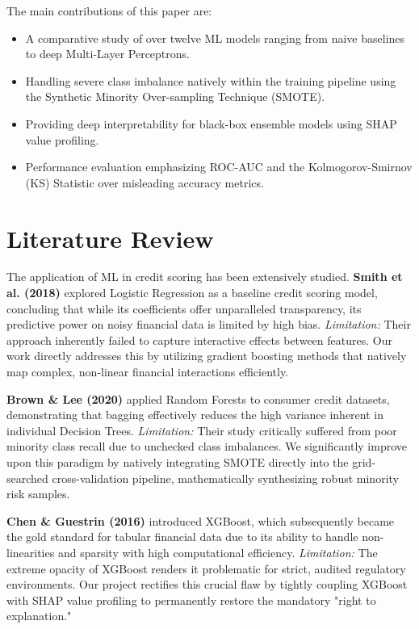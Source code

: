 \documentclass[12pt,a4paper]{article}
\begin{document}
The main contributions of this paper are:
\begin{itemize}
    \item A comparative study of over twelve ML models ranging from naive baselines to deep Multi-Layer Perceptrons.
    \item Handling severe class imbalance natively within the training pipeline using the Synthetic Minority Over-sampling Technique (SMOTE).
    \item Providing deep interpretability for black-box ensemble models using SHAP value profiling.
    \item Performance evaluation emphasizing ROC-AUC and the Kolmogorov-Smirnov (KS) Statistic over misleading accuracy metrics.
\end{itemize}

\section{Literature Review}
The application of ML in credit scoring has been extensively studied.
\textbf{Smith et al. (2018)} explored Logistic Regression as a baseline credit scoring model, concluding that while its coefficients offer unparalleled transparency, its predictive power on noisy financial data is limited by high bias. \textit{Limitation:} Their approach inherently failed to capture interactive effects between features. Our work directly addresses this by utilizing gradient boosting methods that natively map complex, non-linear financial interactions efficiently.

\textbf{Brown \& Lee (2020)} applied Random Forests to consumer credit datasets, demonstrating that bagging effectively reduces the high variance inherent in individual Decision Trees. \textit{Limitation:} Their study critically suffered from poor minority class recall due to unchecked class imbalances. We significantly improve upon this paradigm by natively integrating SMOTE directly into the grid-searched cross-validation pipeline, mathematically synthesizing robust minority risk samples.

\textbf{Chen \& Guestrin (2016)} introduced XGBoost, which subsequently became the gold standard for tabular financial data due to its ability to handle non-linearities and sparsity with high computational efficiency. \textit{Limitation:} The extreme opacity of XGBoost renders it problematic for strict, audited regulatory environments. Our project rectifies this crucial flaw by tightly coupling XGBoost with SHAP value profiling to permanently restore the mandatory "right to explanation."
\end{document}
